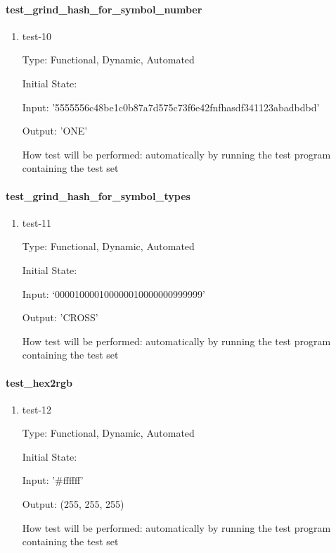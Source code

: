 \documentclass[12pt, titlepage]{article}
\begin{document}
\paragraph{test\_grind\_hash\_for\_symbol\_number}

\begin{enumerate}

\item{test-10\\}

Type: Functional, Dynamic, Automated

Initial State:

Input: '5555556c48be1c0b87a7d575c73f6e42fnfhasdf341123abadbdbd'

Output: 'ONE'

How test will be performed: automatically by running the test program
containing the test set

\end{enumerate}

\paragraph{test\_grind\_hash\_for\_symbol\_types}

\begin{enumerate}

\item{test-11\\}

Type: Functional, Dynamic, Automated

Initial State:

Input: ‘000010000100000010000000999999’

Output: 'CROSS'

How test will be performed: automatically by running the test program
containing the test set

\end{enumerate}

\paragraph{test\_hex2rgb}

\begin{enumerate}

\item{test-12\\}

Type: Functional, Dynamic, Automated

Initial State:

Input: '\#ffffff'

Output: (255, 255, 255)

How test will be performed: automatically by running the test program
containing the test set

\end{enumerate}
\end{document}

